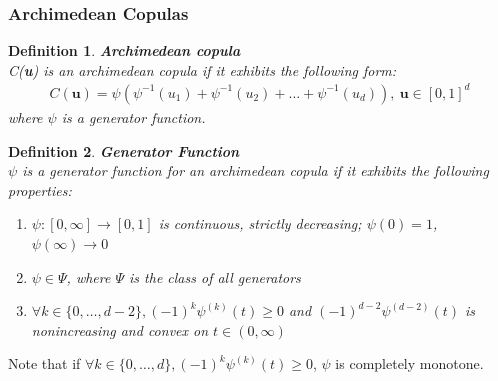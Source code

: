 \documentclass[12pt]{report}
\newtheorem{definition}{Definition}[subsection]
\newcommand{\1}{\mathbf{1}}
\begin{document}
\subsubsection{Archimedean Copulas}
\vspace{0.5cm}

\begin{definition}\label{ArchimedeanDefinition}
\textit{\normalfont\parencite{HofertBook}} \:\textbf{Archimedean copula} \\

C(\textbf{u}) is an archimedean copula if it exhibits the following form: \\
\vspace{-0.8cm}
\begin{align*}
C(\boldsymbol{u}) = \psi(\psi^{-1}(u_{1}) + \psi^{-1}(u_{2}) + \dots + \psi^{-1}(u_{d})), \: \boldsymbol{u} \in [0, 1]^d
\end{align*}
where $\psi$ is a generator function.
\end{definition}

\begin{definition}\label{GeneratorDefinition}
\textit{\normalfont\parencite{HofertBook}} \:\textbf{Generator Function} \\

$\psi$ is a generator function for an archimedean copula if it exhibits the following properties: \\
\begin{enumerate}
\item $\psi : [0,\infty] \rightarrow [0,1]$ is continuous, strictly decreasing; $\psi(0) = 1$, $\psi(\infty) \rightarrow 0$
\item $\psi \in \Psi$, where $\Psi$ is the class of all generators
\item $ \forall k \in \{0, \dots, d - 2 \}, (-1)^{k} \psi^{(k)}(t) \ge 0$ and $(-1)^{d-2}\psi^{(d-2)}(t)$ is nonincreasing and convex on $t \in (0,\infty)$ 
\end{enumerate}
\end{definition}
Note that if $\forall k \in \{0, \dots, d \}, (-1)^{k} \psi^{(k)}(t) \ge 0$, $\psi$ is completely monotone. \\
\end{document}
